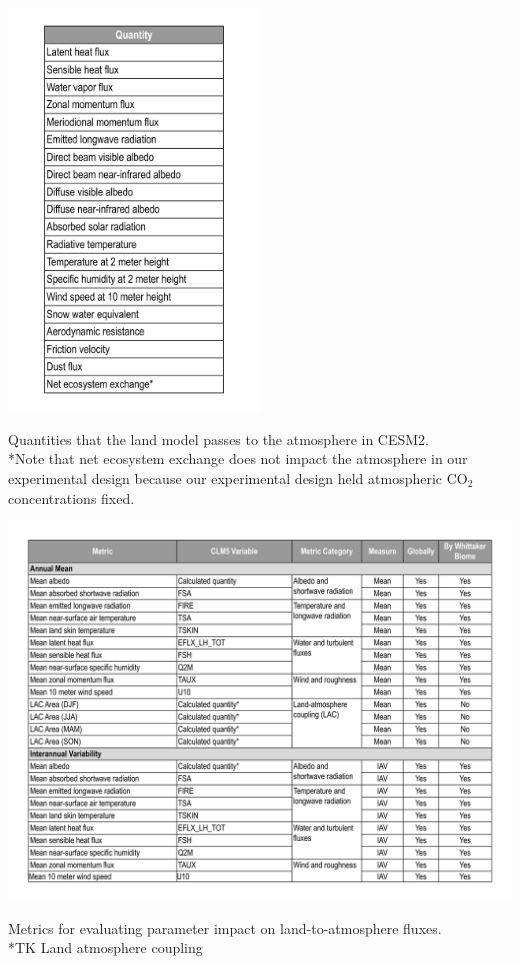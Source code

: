 \documentclass[draft,grl]{agutexSI2019}
\begin{document}
 \begin{table}[htb!]
 \centering
\noindent\includegraphics[width=0.5\textwidth]{writing/figs/Table_Land2Atm_Quantities.pdf}
  \caption{Quantities that the land model passes to the atmosphere in CESM2. \\
  \footnotesize{*Note that net ecosystem exchange does not impact the atmosphere in our experimental design because our experimental design held atmospheric CO$_2$ concentrations fixed.}}
 \label{table:metrics_of_impact}
 \end{table}



\begin{table}[htb!]
\noindent\includegraphics[width=\textwidth]{writing/figs/Table_Quantities_Used_In_Parameter_Selection.pdf}
  \caption{Metrics for evaluating parameter impact on land-to-atmosphere fluxes. \\
    \footnotesize{*TK Land atmosphere coupling
    }}
 \label{table:land2atm_fluxes}
 \end{table}
\end{document}
